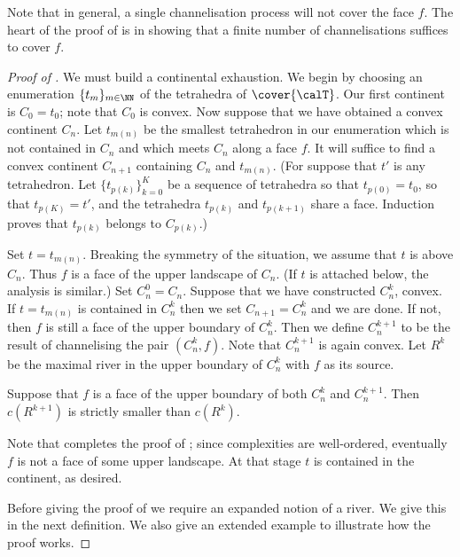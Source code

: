 \documentclass[12pt]{amsart}
\begin{document}
Note that in general, a single channelisation process will not cover the face $f$. The heart of the proof of  is in showing that a finite number of channelisations suffices to cover $f$.

\begin{proof}[Proof of ]
We must build a continental exhaustion.  We begin by choosing an enumeration $\{t_m\}_{m \in \NN}$ of the tetrahedra of $\cover{\calT}$.  
Our first continent is $C_0 = t_0$; note that $C_0$ is convex.  Now suppose that we have obtained a convex continent $C_n$.  Let $t_{m(n)}$ be the smallest tetrahedron in our enumeration which is not contained in $C_n$ and which meets $C_n$ along a face $f$.  It will suffice to find a convex continent $C_{n+1}$ containing $C_n$ and $t_{m(n)}$. (For suppose that $t'$ is any tetrahedron.  Let $\{t_{p(k)}\}_{k = 0}^K$ be a sequence of tetrahedra so that $t_{p(0)} = t_0$, so that $t_{p(K)} = t'$, and the tetrahedra $t_{p(k)}$ and $t_{p(k+1)}$ share a face.  Induction proves that $t_{p(k)}$ belongs to $C_{p(k)}$.)

Set $t = t_{m(n)}$.  Breaking the symmetry of the situation, we assume that $t$ is above $C_n$.  Thus $f$ is a face of the upper landscape of $C_n$.  (If $t$ is attached below, the analysis is similar.)  Set $C_n^0 = C_n$.  Suppose that we have constructed $C_n^k$, convex.  
If $t = t_{m(n)}$ is contained in $C_n^k$ then we set $C_{n+1} = C_n^k$ and we are done.  
If not, then $f$ is still a face of the upper boundary of $C_n^k$.  Then we define $C_n^{k+1}$ to be the result of channelising the pair $(C_n^k, f)$.  Note that $C_n^{k+1}$ is again convex.  Let $R^k$ be the maximal river in the upper boundary of $C_n^k$ with $f$ as its source.

\begin{lemma}
\label{Lem:RiversSimplify}
Suppose that $f$ is a face of the upper boundary of both $C_n^k$ and $C_n^{k+1}$.  Then $c(R^{k+1})$ is strictly smaller than $c(R^k)$.  
\end{lemma}

\noindent
Note that  completes the proof of ; since complexities are well-ordered, eventually $f$ is not a face of some upper landscape.  At that stage $t$ is contained in the continent, as desired. 

Before giving the proof of  we require an expanded notion of a river. We give this in the next definition.  We also give an extended example to illustrate how the proof works. 


\end{proof}
\end{document}

